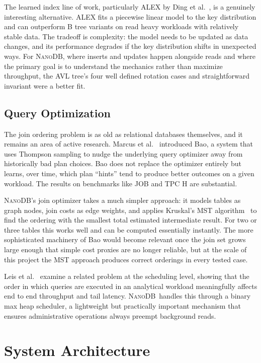 \documentclass[conference]{IEEEtran}
\newcommand{\NanoDB}{\textsc{NanoDB}}
\begin{document}
The learned index line of work, particularly ALEX by Ding et
al.~\cite{ding2020}, is a genuinely interesting alternative. ALEX fits a
piecewise linear model to the key distribution and can outperform B tree variants
on read heavy workloads with relatively stable data. The tradeoff is complexity:
the model needs to be updated as data changes, and its performance degrades if the
key distribution shifts in unexpected ways. For \NanoDB, where inserts and
updates happen alongside reads and where the primary goal is to understand the
mechanics rather than maximize throughput, the AVL tree's four well defined
rotation cases and straightforward invariant were a better fit.

\subsection{Query Optimization}

The join ordering problem is as old as relational databases themselves, and it
remains an area of active research. Marcus et al.~\cite{marcus2021} introduced
Bao, a system that uses Thompson sampling to nudge the underlying query optimizer
away from historically bad plan choices. Bao does not replace the optimizer
entirely but learns, over time, which plan ``hints'' tend to produce better
outcomes on a given workload. The results on benchmarks like JOB and TPC H are
substantial.

\NanoDB's join optimizer takes a much simpler approach: it models tables as graph
nodes, join costs as edge weights, and applies Kruskal's MST
algorithm~\cite{cormen2022} to find the ordering with the smallest total estimated
intermediate result. For two or three tables this works well and can be computed
essentially instantly. The more sophisticated machinery of Bao would become
relevant once the join set grows large enough that simple cost proxies are no
longer reliable, but at the scale of this project the MST approach produces
correct orderings in every tested case.

Leis et al.~\cite{leis2023} examine a related problem at the scheduling level,
showing that the order in which queries are executed in an analytical workload
meaningfully affects end to end throughput and tail latency. \NanoDB\ handles
this through a binary max heap scheduler, a lightweight but practically important
mechanism that ensures administrative operations always preempt background reads.

\section{System Architecture}
\end{document}
